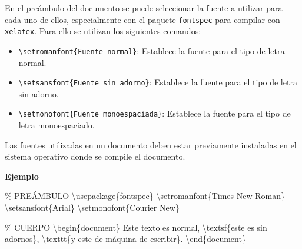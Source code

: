 \documentclass[
  a4paper,
]{scrreport}
\newenvironment{Shaded}{\begin{snugshade}}{\end{snugshade}}
\newcommand{\BuiltInTok}[1]{\textcolor[rgb]{0.00,0.23,0.31}{#1}}
\newcommand{\CommentTok}[1]{\textcolor[rgb]{0.37,0.37,0.37}{#1}}
\newcommand{\ExtensionTok}[1]{\textcolor[rgb]{0.00,0.23,0.31}{#1}}
\newcommand{\FunctionTok}[1]{\textcolor[rgb]{0.28,0.35,0.67}{#1}}
\newcommand{\KeywordTok}[1]{\textcolor[rgb]{0.00,0.23,0.31}{#1}}
\newcommand{\NormalTok}[1]{\textcolor[rgb]{0.00,0.23,0.31}{#1}}
\providecommand{\tightlist}{%
  \setlength{\itemsep}{0pt}\setlength{\parskip}{0pt}}\usepackage{longtable,booktabs,array}
\begin{document}
En el preámbulo del documento se puede seleccionar la fuente a utilizar
para cada uno de ellos, especialmente con el paquete \texttt{fontspec}
para compilar con \texttt{xelatex}. Para ello se utilizan los siguientes
comandos:

\begin{itemize}
\tightlist
\item
  \texttt{\textbackslash{}setromanfont\{Fuente\ normal\}}: Establece la
  fuente para el tipo de letra normal.
\item
  \texttt{\textbackslash{}setsansfont\{Fuente\ sin\ adorno\}}: Establece
  la fuente para el tipo de letra sin adorno.
\item
  \texttt{\textbackslash{}setmonofont\{Fuente\ monoespaciada\}}:
  Establece la fuente para el tipo de letra monoespaciado.
\end{itemize}

\begin{tcolorbox}[enhanced jigsaw, bottomrule=.15mm, leftrule=.75mm, opacityback=0, titlerule=0mm, bottomtitle=1mm, colbacktitle=quarto-callout-caution-color!10!white, arc=.35mm, toprule=.15mm, colframe=quarto-callout-caution-color-frame, title=\textcolor{quarto-callout-caution-color}{\faFire}\hspace{0.5em}{Precaución}, coltitle=black, colback=white, breakable, toptitle=1mm, rightrule=.15mm, left=2mm, opacitybacktitle=0.6]

Las fuentes utilizadas en un documento deben estar previamente
instaladas en el sistema operativo donde se compile el documento.

\end{tcolorbox}

\textbf{Ejemplo}

\begin{Shaded}
\begin{Highlighting}[]
\CommentTok{\% PREÁMBULO}
\BuiltInTok{\textbackslash{}usepackage}\NormalTok{\{}\ExtensionTok{fontspec}\NormalTok{\}}
\FunctionTok{\textbackslash{}setromanfont}\NormalTok{\{Times New Roman\}}
\FunctionTok{\textbackslash{}setsansfont}\NormalTok{\{Arial\}}
\FunctionTok{\textbackslash{}setmonofont}\NormalTok{\{Courier New\}}

\CommentTok{\% CUERPO}
\KeywordTok{\textbackslash{}begin}\NormalTok{\{}\ExtensionTok{document}\NormalTok{\}}
\NormalTok{Este texto es normal, }\FunctionTok{\textbackslash{}textsf}\NormalTok{\{este es sin adornos\}, }
\FunctionTok{\textbackslash{}texttt}\NormalTok{\{y este de máquina de escribir\}.}
\KeywordTok{\textbackslash{}end}\NormalTok{\{}\ExtensionTok{document}\NormalTok{\}}
\end{Highlighting}
\end{Shaded}
\end{document}
